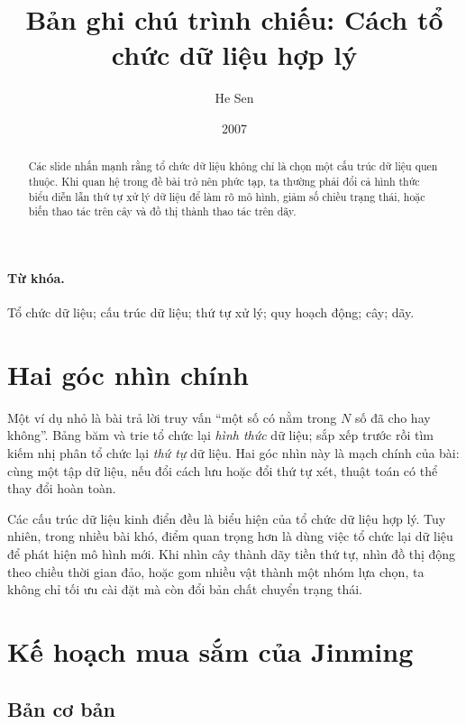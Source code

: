 \documentclass[11pt]{article}
\title{Bản ghi chú trình chiếu: Cách tổ chức dữ liệu hợp lý}
\author{He Sen}
\date{2007}
\begin{document}
\maketitle


\begin{abstract}
Các slide nhấn mạnh rằng tổ chức dữ liệu không chỉ là chọn một cấu trúc dữ
liệu quen thuộc. Khi quan hệ trong đề bài trở nên phức tạp, ta thường phải
đổi cả hình thức biểu diễn lẫn thứ tự xử lý dữ liệu để làm rõ mô hình, giảm
số chiều trạng thái, hoặc biến thao tác trên cây và đồ thị thành thao tác trên
dãy.
\end{abstract}

\paragraph{Từ khóa.}
Tổ chức dữ liệu; cấu trúc dữ liệu; thứ tự xử lý; quy hoạch động; cây; dãy.

\section{Hai góc nhìn chính}

Một ví dụ nhỏ là bài trả lời truy vấn ``một số có nằm trong \(N\) số đã cho
hay không''. Bảng băm và trie tổ chức lại \emph{hình thức} dữ liệu; sắp xếp
trước rồi tìm kiếm nhị phân tổ chức lại \emph{thứ tự} dữ liệu. Hai góc nhìn
này là mạch chính của bài: cùng một tập dữ liệu, nếu đổi cách lưu hoặc đổi
thứ tự xét, thuật toán có thể thay đổi hoàn toàn.

Các cấu trúc dữ liệu kinh điển đều là biểu hiện của tổ chức dữ liệu hợp lý.
Tuy nhiên, trong nhiều bài khó, điểm quan trọng hơn là dùng việc tổ chức lại
dữ liệu để phát hiện mô hình mới. Khi nhìn cây thành dãy tiền thứ tự, nhìn
đồ thị động theo chiều thời gian đảo, hoặc gom nhiều vật thành một nhóm lựa
chọn, ta không chỉ tối ưu cài đặt mà còn đổi bản chất chuyển trạng thái.

\section{Kế hoạch mua sắm của Jinming}

\subsection{Bản cơ bản}
\end{document}
